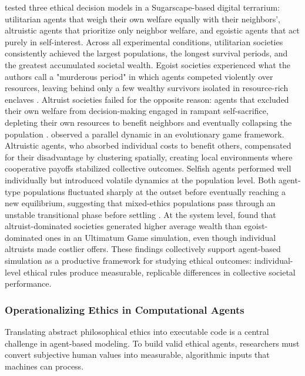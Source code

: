 \documentclass{icsthesis}
\begin{document}
\begin{mainmatter}
\citet{KremerHerman2024} tested three ethical decision models in a Sugarscape-based digital terrarium: utilitarian agents that weigh their own welfare equally with their neighbors', altruistic agents that prioritize only neighbor welfare, and egoistic agents that act purely in self-interest. Across all experimental conditions, utilitarian societies consistently achieved the largest populations, the longest survival periods, and the greatest accumulated societal wealth. Egoist societies experienced what the authors call a "murderous period" in which agents competed violently over resources, leaving behind only a few wealthy survivors isolated in resource-rich enclaves \citep{KremerHerman2024}. Altruist societies failed for the opposite reason: agents that excluded their own welfare from decision-making engaged in rampant self-sacrifice, depleting their own resources to benefit neighbors and eventually collapsing the population \citep{KremerHerman2024}. \citet{Xiang2008} observed a parallel dynamic in an evolutionary game framework. Altruistic agents, who absorbed individual costs to benefit others, compensated for their disadvantage by clustering spatially, creating local environments where cooperative payoffs stabilized collective outcomes. Selfish agents performed well individually but introduced volatile dynamics at the population level. Both agent-type populations fluctuated sharply at the outset before eventually reaching a new equilibrium, suggesting that mixed-ethics populations pass through an unstable transitional phase before settling \citep{Xiang2008}. At the system level, \citet{Scalco2015} found that altruist-dominated societies generated higher average wealth than egoist-dominated ones in an Ultimatum Game simulation, even though individual altruists made costlier offers. These findings collectively support agent-based simulation as a productive framework for studying ethical outcomes: individual-level ethical rules produce measurable, replicable differences in collective societal performance.

\subsubsection{Operationalizing Ethics in Computational Agents}
Translating abstract philosophical ethics into executable code is a central challenge in agent-based modeling. To build valid ethical agents, researchers must convert subjective human values into measurable, algorithmic inputs that machines can process.


\end{mainmatter}
\end{document}
